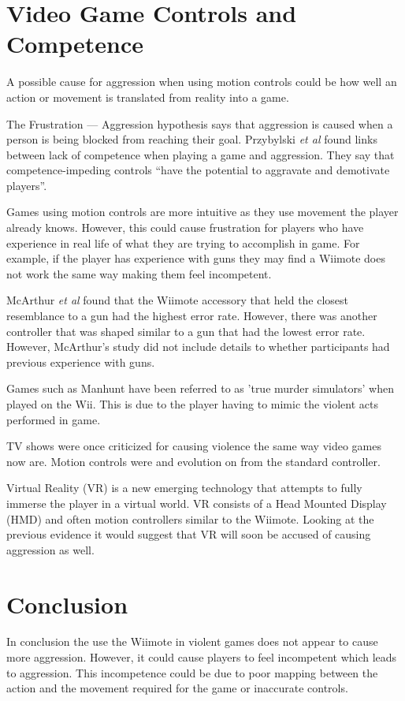 \documentclass{scrartcl}
\begin{document}
\section{Video Game Controls and Competence}
A possible cause for aggression when using motion controls could be how well an action or movement is translated from reality into a game.  

The Frustration --- Aggression hypothesis says that aggression is caused when a person is being blocked from reaching their goal. \cite{dollard1939frustration}  Przybylski \textit{et al} found links between lack of competence when playing a game and aggression. They say that competence-impeding controls ``have the potential to aggravate and demotivate players”. \cite{przybylski}

Games using motion controls are more intuitive as they use movement the player already knows. \cite{Kim} However, this could cause frustration for players who have experience in real life of what they are trying to accomplish in game. For example, if the player has experience with guns they may find a Wiimote does not work the same way making them feel incompetent. 

McArthur \textit{et al}  found that the Wiimote accessory that held the closest resemblance to a gun had the highest error rate. However, there was another controller that was shaped similar to a gun that had the lowest error rate. \cite{McArthur}  However, McArthur's study did not include details to whether participants had previous experience with guns.  

 
\bigskip
Games such as Manhunt have been referred to as 'true murder simulators' when played on the Wii. \cite{Manhunt} This is due to the player having to mimic the violent acts performed in game.

TV shows were once criticized for causing violence the same way video games now are. \cite{sherry2001effects} 
Motion controls were and evolution on from the standard controller.

Virtual Reality (VR) is a new emerging technology that attempts to fully immerse the player in a virtual world. VR consists of a Head Mounted Display (HMD) and often motion controllers similar to the Wiimote.
Looking at the previous evidence it would suggest that VR will soon be accused of causing aggression as well. 

\section{Conclusion}
In conclusion the use the Wiimote in violent games does not appear to cause more aggression. However, it could cause players to feel incompetent which leads to aggression. This incompetence could be due to poor mapping between the action and the movement required for the game or inaccurate controls. 

	


	
\end{document}
